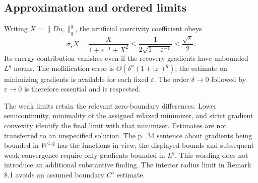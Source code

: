 \documentclass[10pt]{article}
\begin{document}
\subsection*{Approximation and ordered limits}
Writing \(X=\|D\widetilde u_\varepsilon\|_q^q\), the artificial coercivity coefficient obeys \[\sigma_\varepsilon X
 =\frac{X}{1+\varepsilon^{-1}+X^2}
 \leq\frac{1}{2\sqrt{1+\varepsilon^{-1}}}
 \leq\frac{\sqrt\varepsilon}{2}.\] Its energy contribution vanishes even if the recovery gradients have unbounded \(L^q\) norms. The mollification error is \(O(\delta^\alpha(1+|z|)^q)\); the estimate on minimizing gradients is available for each fixed \(\varepsilon\). The order \(\delta\to0\) followed by \(\varepsilon\to0\) is therefore essential and is respected.\par
The weak limits retain the relevant zero-boundary differences. Lower semicontinuity, minimality of the assigned relaxed minimizer, and strict gradient convexity identify the final limit with that minimizer. Estimates are not transferred to an unspecified solution. The p. 34 sentence about gradients being bounded in \(W^{1,q}\) has the functions in view; the displayed bounds and subsequent weak convergence require only gradients bounded in \(L^q\). This wording does not introduce an additional substantive finding. The interior radius limit in Remark 8.1 avoids an assumed boundary \(C^1\) estimate.\par
\end{document}
